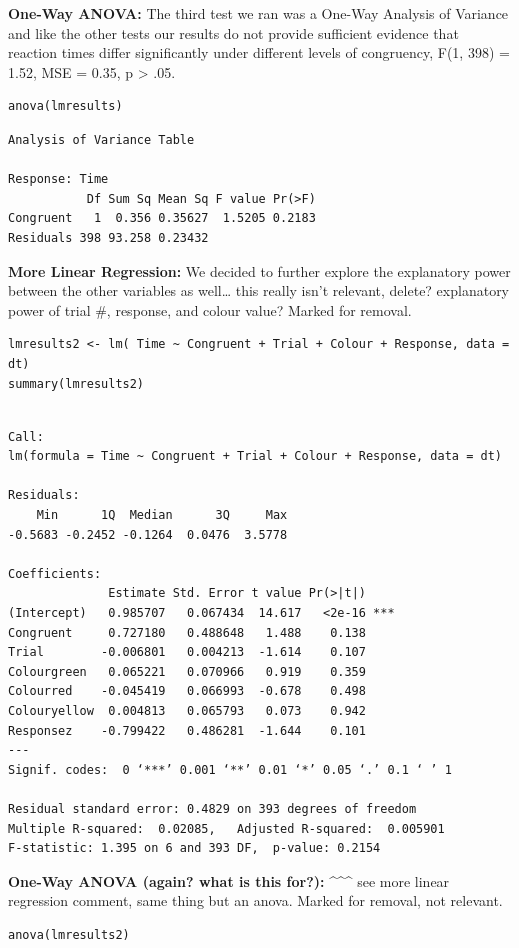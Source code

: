 \documentclass{article}
\begin{document}
\vspace{11em} \textbf{One-Way ANOVA:} The third test we ran was a One-Way Analysis of Variance and like the other tests our results do not provide sufficient evidence that reaction times differ significantly under different levels of congruency, F(1, 398) = 1.52, MSE = 0.35, p > .05.
\begin{verbatim}
anova(lmresults)
\end{verbatim}

\begin{verbatim}
Analysis of Variance Table

Response: Time
           Df Sum Sq Mean Sq F value Pr(>F)
Congruent   1  0.356 0.35627  1.5205 0.2183
Residuals 398 93.258 0.23432
\end{verbatim}

\vspace{2em} \textbf{More Linear Regression:} We decided to further explore the explanatory power between the other variables as well\ldots{} this really isn't relevant, delete? explanatory power of trial \#, response, and colour value? Marked for removal.
\begin{verbatim}
lmresults2 <- lm( Time ~ Congruent + Trial + Colour + Response, data = dt)
summary(lmresults2)
\end{verbatim}

\begin{verbatim}

Call:
lm(formula = Time ~ Congruent + Trial + Colour + Response, data = dt)

Residuals:
    Min      1Q  Median      3Q     Max 
-0.5683 -0.2452 -0.1264  0.0476  3.5778 

Coefficients:
              Estimate Std. Error t value Pr(>|t|)    
(Intercept)   0.985707   0.067434  14.617   <2e-16 ***
Congruent     0.727180   0.488648   1.488    0.138    
Trial        -0.006801   0.004213  -1.614    0.107    
Colourgreen   0.065221   0.070966   0.919    0.359    
Colourred    -0.045419   0.066993  -0.678    0.498    
Colouryellow  0.004813   0.065793   0.073    0.942    
Responsez    -0.799422   0.486281  -1.644    0.101    
---
Signif. codes:  0 ‘***’ 0.001 ‘**’ 0.01 ‘*’ 0.05 ‘.’ 0.1 ‘ ’ 1

Residual standard error: 0.4829 on 393 degrees of freedom
Multiple R-squared:  0.02085,	Adjusted R-squared:  0.005901 
F-statistic: 1.395 on 6 and 393 DF,  p-value: 0.2154
\end{verbatim}

\vspace{2em} \textbf{One-Way ANOVA (again? what is this for?):} \^{}\^{}\^{} see more linear regression comment, same thing but an anova. Marked for removal, not relevant. 
\begin{verbatim}
anova(lmresults2)
\end{verbatim}
\end{document}
